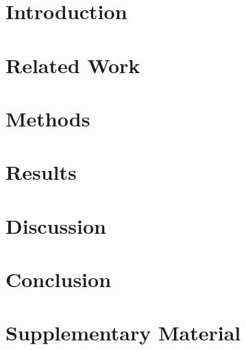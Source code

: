 \documentclass[11pt]{article}
\begin{document}
\section{Introduction}
\label{sec:introduction}


\section{Related Work}
\label{sec:related}


\section{Methods}
\label{sec:methods}



\section{Results}
\label{sec:results}


\section{Discussion}
\label{sec:discussion}


\section{Conclusion}
\label{sec:conclusion}





\appendix

\renewcommand{\thetable}{S\arabic{table}}
\renewcommand{\thefigure}{S\arabic{figure}}
\setcounter{table}{0}
\setcounter{figure}{0}

\section{Supplementary Material}
\label{sec:supplementary}

\end{document}
